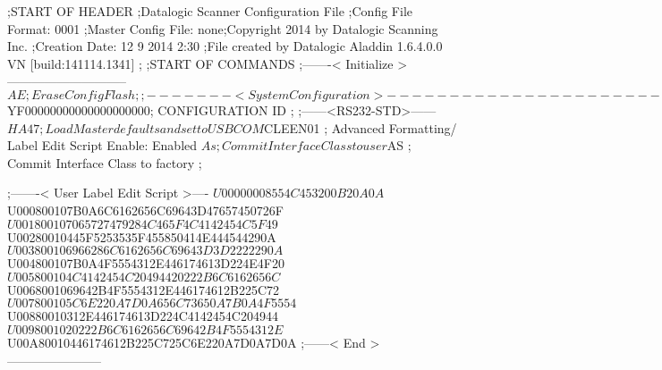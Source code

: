 ;START OF HEADER
;Datalogic Scanner Configuration File
;Config File Format: 0001
;Master Config File: none;Copyright 2014 by Datalogic Scanning Inc.
;Creation Date: 12 9 2014 2:30
;File created by Datalogic Aladdin 1.6.4.0.0 VN [build:141114.1341]
;
;START OF COMMANDS
;-------< Initialize >-----------------------------
$AE                 ; Erase Config Flash
;
;-------< System Configuration >-------------------------------
$YF00000000000000000000; CONFIGURATION ID
;
;------<RS232-STD>------
$HA47              ; Load Master defaults and set to USBCOM
$CLEEN01            ; Advanced Formatting/ Label Edit Script Enable: Enabled
$As                 ; Commit Interface Class to user
$AS                 ; Commit Interface Class to factory
;

;-------< User Label Edit Script >----
$U00000008554C453200B20A0A
$U000800107B0A6C6162656C69643D47657450726F
$U001800107065727479284C465F4C4142454C5F49
$U00280010445F5253535F455850414E444544290A
$U003800106966286C6162656C69643D3D2222290A
$U004800107B0A4F5554312E446174613D224E4F20
$U005800104C4142454C20494420222B6C6162656C
$U0068001069642B4F5554312E446174612B225C72
$U007800105C6E220A7D0A656C73650A7B0A4F5554
$U00880010312E446174613D224C4142454C204944
$U0098001020222B6C6162656C69642B4F5554312E
$U00A80010446174612B225C725C6E220A7D0A7D0A
;------< End >-----------------------
